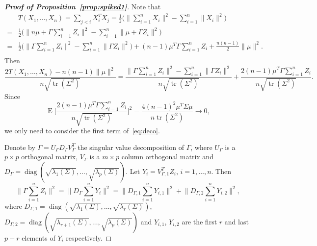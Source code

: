 \documentclass[review]{elsarticle}
\DeclareMathOperator{\mytr}{tr}
\DeclareMathOperator{\mydiag}{diag}
\DeclareMathOperator{\myE}{E}
\theoremstyle{plain}
\theoremstyle{definition}
\theoremstyle{remark}
\begin{document}
\begin{proof}[\textbf{Proof of Proposition~\ref{prop:spiked1}}]
    Note that
    $$
    \begin{aligned}
        &T(X_1,\ldots,X_n)=\sum_{j<i} X_i^T X_j
        = \frac{1}{2}\Big(\big\|\sum_{i=1}^n X_i \big\|^2-\sum_{i=1}^n \| X_i \|^2\Big)\\
        =&
        \frac{1}{2}\Big(\big\|n\mu+\Gamma\sum_{i=1}^n Z_i \big\|^2-\sum_{i=1}^n \| \mu+\Gamma Z_i \|^2\Big)\\
        =&
        \frac{1}{2}\Big(\big\|\Gamma\sum_{i=1}^n Z_i \big\|^2-\sum_{i=1}^n \| \Gamma Z_i \|^2\Big)+(n-1)\mu^T \Gamma \sum_{i=1}^n Z_i+\frac{n(n-1)}{2}\|\mu\|^2.\\
    \end{aligned}
    $$
    Then
    \begin{equation}\label{eq:deco}
    \frac{2T(X_1,\ldots,X_n)-n(n-1)\|\mu\|^2}{n\sqrt{\mytr(\Sigma^2)}}
    =\frac{\big\|\Gamma\sum_{i=1}^n Z_i \big\|^2-\sum_{i=1}^n \| \Gamma Z_i \|^2}{n\sqrt{\mytr(\Sigma^2)}}
    +
    \frac{2(n-1) \mu^T \Gamma \sum_{i=1}^n Z_i}{n\sqrt{\mytr(\Sigma^2)}}.
    \end{equation}
    Since
    $$
    \myE \Big[\frac{2(n-1) \mu^T \Gamma \sum_{i=1}^n Z_i}{n\sqrt{\mytr(\Sigma^2)}}\Big]^2=\frac{4(n-1)^2 \mu^T \Sigma \mu}{n \mytr(\Sigma^2)}\to 0,
    $$
    we only need to consider the first term of~\eqref{eq:deco}.



    Denote by $\Gamma= U_{\Gamma}D_{\Gamma}V_{\Gamma}^T$ the singular value decomposition of $\Gamma$, where $U_{\Gamma}$ is a $p\times p$ orthogonal matrix, $V_{\Gamma}$ is a $m\times p$ column orthogonal matrix and $D_{\Gamma}=\mydiag(\sqrt{\lambda_1(\Sigma)},\ldots,\sqrt{\lambda_p(\Sigma)})$.
    Let $Y_i=V_{\Gamma,1}^T Z_i$, $i=1,\ldots,n$.
    Then
$$
    \big\|\Gamma \sum_{i=1}^n Z_i\big\|^2
    =
    \big\|D_\Gamma \sum_{i=1}^n Y_i\big\|^2
    =
    \big\|D_{\Gamma,1} \sum_{i=1}^n Y_{i,1}\big\|^2
    +
    \big\|D_{\Gamma,2} \sum_{i=1}^n Y_{i,2}\big\|^2,
$$
    where $D_{\Gamma,1}=\mydiag(\sqrt{\lambda_1(\Sigma)},\ldots,\sqrt{\lambda_r(\Sigma)})$, $D_{\Gamma,2}=\mydiag(\sqrt{\lambda_{r+1}(\Sigma)},\ldots,\sqrt{\lambda_p(\Sigma)})$ and $Y_{i,1}$, $Y_{i,2}$ are the first $r$ and last $p-r$ elements of $Y_i$ respectively.



\end{proof}
\end{document}
